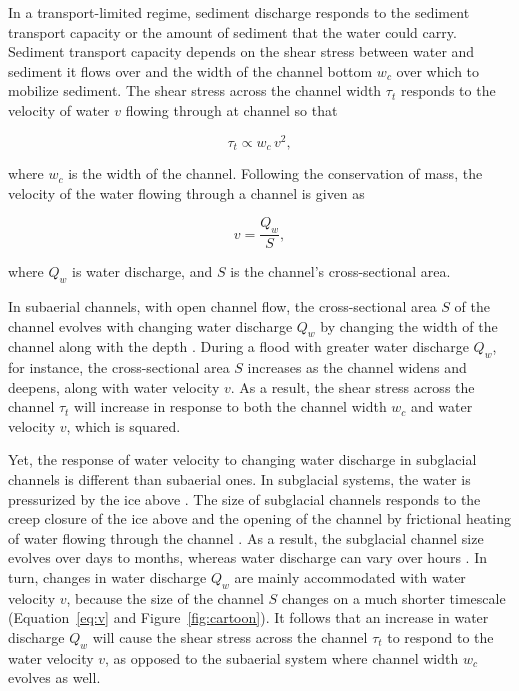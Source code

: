 \documentclass[11pt]{article}
\begin{document}
In a transport-limited regime, sediment discharge responds to the sediment transport capacity or the amount of sediment that the water could carry. Sediment transport capacity depends on the shear stress between water and sediment it flows  over \citep{shields1936,meyer1948,engelund1967} and the width of the channel bottom $w_c$ over which to mobilize sediment. The shear stress  across the channel width $\tau_t$ responds to the velocity of water $v$ flowing through at channel so that 
\begin{linenomath*}
  \begin{equation}
    \label{eq:tau_t}
    \tau_t \propto w_c\, v^2,
  \end{equation}
\end{linenomath*}
% 
where $w_c$ is the width of the channel.
Following the conservation of mass, the velocity of the water flowing through a  channel is given as 
\begin{linenomath*}
  \begin{equation}
    \label{eq:v}
    v = \frac{Q_w}{S},
  \end{equation}
\end{linenomath*}
% 
where $Q_w$ is water discharge,  and $S$ is the channel's cross-sectional area.

In subaerial channels, with open channel flow, the cross-sectional area $S$ of the channel evolves with changing water discharge $Q_w$  by changing the width of the channel along with the depth \citep{leopold1953}. During a flood with greater water discharge $Q_w$, for instance, the cross-sectional area $S$ increases as the channel widens and deepens, along with water velocity $v$. As a result, the shear stress across the channel $\tau_t$ will increase in response to both the channel width $w_c$  and water velocity $v$, which is squared. 

Yet, the response of water velocity to changing water discharge in subglacial channels is different than subaerial ones.
In subglacial systems, the water is pressurized by the ice above \citep{rothlisberger1972}.
The size of subglacial channels responds to the creep closure of the ice above and the opening of the channel by frictional heating of water flowing through the channel \citep{rothlisberger1972}.
As a result, the subglacial channel size evolves over days to months, whereas water discharge can vary over hours \citep[e.g.][]{iken1986,andrews2014,nanni2020}.
In turn, changes in water discharge $Q_w$ are mainly accommodated with water velocity $v$, because the size of the channel $S$ changes on a much shorter timescale (Equation~\ref{eq:v} and Figure~\ref{fig:cartoon}).
It follows that an increase in water discharge $Q_w$ will cause the shear stress across the channel $\tau_t$ to respond to the water velocity $v$, as opposed to the subaerial system where channel width $w_c$ evolves as well. 
\end{document}
